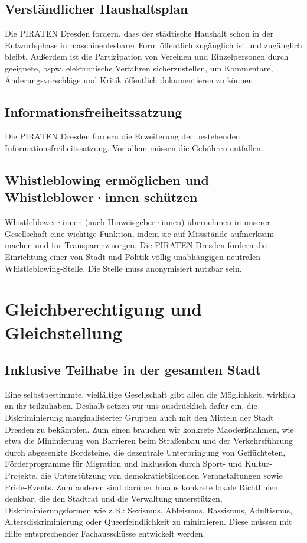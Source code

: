 \documentclass[a4paper, 11pt]{article}
\begin{document}
\subsection{Verständlicher Haushaltsplan}
Die PIRATEN Dresden fordern, dass der städtische Haushalt schon in der Entwurfsphase in maschinenlesbarer Form öffentlich zugänglich ist und zugänglich bleibt. Außerdem ist die Partizipation von Vereinen und Einzelpersonen durch geeignete, bspw. elektronische Verfahren sicherzustellen, um Kommentare, Änderungsvorschläge und Kritik öffentlich dokumentieren zu können.


\subsection{Informationsfreiheitssatzung}
Die PIRATEN Dresden fordern die Erweiterung der bestehenden Informationsfreiheitssatzung. Vor allem müssen die Gebühren entfallen.


\subsection{Whistleblowing ermöglichen und Whistleblower·innen schützen}
Whistleblower·innen (auch Hinweisgeber·innen) übernehmen in unserer Gesellschaft eine wichtige Funktion, indem sie auf Missstände aufmerksam machen und für Transparenz sorgen. Die PIRATEN Dresden fordern die Einrichtung einer von Stadt und Politik völlig unabhängigen neutralen Whistleblowing-Stelle. Die Stelle muss anonymisiert nutzbar sein.


\section{Gleichberechtigung und Gleichstellung}

\subsection{Inklusive Teilhabe in der gesamten Stadt}
Eine selbstbestimmte, vielfältige Gesellschaft gibt allen die Möglichkeit, wirklich an ihr teilzuhaben. Deshalb setzen wir uns ausdrücklich dafür ein, die Diskriminierung marginalisierter Gruppen auch mit den Mitteln der Stadt Dresden zu bekämpfen. Zum einen brauchen wir konkrete Maoderßnahmen, wie etwa die Minimierung von Barrieren beim Straßenbau und der Verkehrsführung durch abgesenkte Bordsteine, die dezentrale Unterbringung von Geflüchteten, Förderprogramme für Migration und Inklussion durch Sport- und Kultur-Projekte, die Unterstützung von demokratiebildenden Veranstaltungen sowie Pride-Events. Zum anderen sind darüber hinaus konkrete lokale Richtlinien denkbar, die den Stadtrat und die Verwaltung unterstützen, Diskriminierungsformen wie z.B.: Sexismus, Ableismus, Rassismus, Adultismus, Altersdiskriminierung oder Queerfeindlichkeit zu minimieren. Diese müssen mit Hilfe entsprechender Fachausschüsse entwickelt werden.
\end{document}
